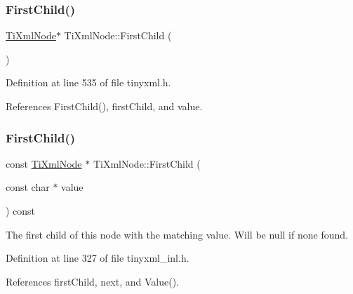 \hypertarget{class_ti_xml_node_a5e97d69b7c0ebd27fb7286be56559b77}{}\label{class_ti_xml_node_a5e97d69b7c0ebd27fb7286be56559b77} 
\subsubsection{\texorpdfstring{First\+Child()}{FirstChild()}\hspace{0.1cm}{\footnotesize\ttfamily [2/6]}}
{\footnotesize\ttfamily \hyperlink{class_ti_xml_node}{Ti\+Xml\+Node}$\ast$ Ti\+Xml\+Node\+::\+First\+Child (\begin{DoxyParamCaption}{ }\end{DoxyParamCaption})\hspace{0.3cm}{\ttfamily [inline]}}



Definition at line 535 of file tinyxml.\+h.



References First\+Child(), first\+Child, and value.

\hypertarget{class_ti_xml_node_ae98c367f664890c4b5a5183481ec128a}{}\label{class_ti_xml_node_ae98c367f664890c4b5a5183481ec128a} 
\subsubsection{\texorpdfstring{First\+Child()}{FirstChild()}\hspace{0.1cm}{\footnotesize\ttfamily [3/6]}}
{\footnotesize\ttfamily const \hyperlink{class_ti_xml_node}{Ti\+Xml\+Node} $\ast$ Ti\+Xml\+Node\+::\+First\+Child (\begin{DoxyParamCaption}\item[{const char $\ast$}]{value }\end{DoxyParamCaption}) const}

The first child of this node with the matching \textquotesingle{}value\textquotesingle{}. Will be null if none found. 

Definition at line 327 of file tinyxml\+\_\+inl.\+h.



References first\+Child, next, and Value().

\hypertarget{class_ti_xml_node_abc8bf32be6419ec453a731868de19554}{}\label{class_ti_xml_node_abc8bf32be6419ec453a731868de19554} 
